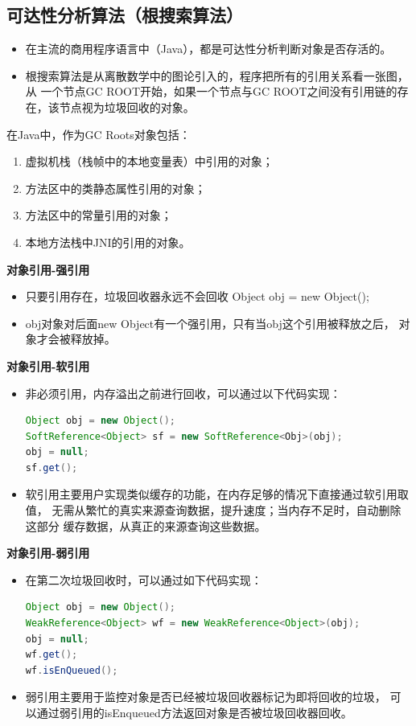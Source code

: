 \subsection{可达性分析算法（根搜索算法）}
\begin{itemize}
	\item 在主流的商用程序语言中（Java），都是可达性分析判断对象是否存活的。
	\item 根搜索算法是从离散数学中的图论引入的，程序把所有的引用关系看一张图，从
	一个节点GC ROOT开始，如果一个节点与GC ROOT之间没有引用链的存在，该节点视为垃圾回收的对象。
\end{itemize}
\par 在Java中，作为GC Roots对象包括：
\begin{enumerate}
	\item 虚拟机栈（栈帧中的本地变量表）中引用的对象；
	\item 方法区中的类静态属性引用的对象；
	\item 方法区中的常量引用的对象；
	\item 本地方法栈中JNI的引用的对象。
\end{enumerate}
\textbf{对象引用-强引用}
\begin{itemize}
	\item 只要引用存在，垃圾回收器永远不会回收
	\subitem Object obj = new Object();
	\item obj对象对后面new Object有一个强引用，只有当obj这个引用被释放之后，
	对象才会被释放掉。
\end{itemize}
\textbf{对象引用-软引用}
\begin{itemize}
	\item 非必须引用，内存溢出之前进行回收，可以通过以下代码实现：
	\begin{lstlisting}[language=java]
Object obj = new Object();
SoftReference<Object> sf = new SoftReference<Obj>(obj);
obj = null;
sf.get();
	\end{lstlisting}
	\item 软引用主要用户实现类似缓存的功能，在内存足够的情况下直接通过软引用取值，
	无需从繁忙的真实来源查询数据，提升速度；当内存不足时，自动删除这部分
	缓存数据，从真正的来源查询这些数据。
\end{itemize}
\textbf{对象引用-弱引用}
\begin{itemize}
	\item 在第二次垃圾回收时，可以通过如下代码实现：
	\begin{lstlisting}[language=java]
Object obj = new Object();
WeakReference<Object> wf = new WeakReference<Object>(obj);
obj = null;
wf.get();
wf.isEnQueued();
	\end{lstlisting}
	\item 弱引用主要用于监控对象是否已经被垃圾回收器标记为即将回收的垃圾，
	可以通过弱引用的isEnqueued方法返回对象是否被垃圾回收器回收。
\end{itemize}
